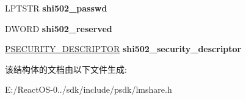 \begin{DoxyCompactItemize}
L\+P\+T\+S\+TR {\bfseries shi502\+\_\+passwd}
\item 
\mbox{\label{struct___s_h_a_r_e___i_n_f_o__502_a068e3b2f658b936bc17e794dabcecf3d}} 
D\+W\+O\+RD {\bfseries shi502\+\_\+reserved}
\item 
\mbox{\label{struct___s_h_a_r_e___i_n_f_o__502_a740b144ffdde49bc957a20fe9b72f101}} 
\hyperlink{struct___s_e_c_u_r_i_t_y___d_e_s_c_r_i_p_t_o_r}{P\+S\+E\+C\+U\+R\+I\+T\+Y\+\_\+\+D\+E\+S\+C\+R\+I\+P\+T\+OR} {\bfseries shi502\+\_\+security\+\_\+descriptor}
\end{DoxyCompactItemize}


该结构体的文档由以下文件生成\+:\begin{DoxyCompactItemize}
\item 
E\+:/\+React\+O\+S-\/0../sdk/include/psdk/lmshare.\+h\end{DoxyCompactItemize}
